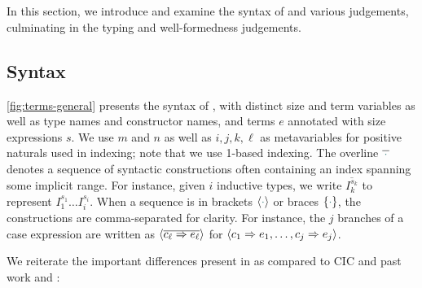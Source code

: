 \section{\titlelang}\label{sec:typing}
In this section, we introduce and examine the syntax of \lang and various judgements,
culminating in the typing and well-formedness judgements.

\subsection{Syntax}




\autoref{fig:terms-general} presents the syntax of \lang,
with distinct size and term variables as well as \coinductive type names and \coinductive constructor names,
and terms $e$ annotated with size expressions $s$.
We use $m$ and $n$ as well as $i, j, k, \ell$ as metavariables for positive naturals used in indexing; note that we use 1-based indexing.
The overline $\overline{\,\ph\,}$ denotes a sequence of syntactic constructions often containing an index spanning some implicit range.
For instance, given $i$ inductive types, we write $\overline{I^{s_k}_k}$ to represent $I^{s_1}_1 \dots I^{s_i}_i$.
When a sequence is in brackets $\seq{\ph}$ or braces $\set{\ph}$,
the constructions are comma-separated for clarity.
For instance, the $j$ branches of a case expression are written as $\langle\overline{c_\ell \Rightarrow e_\ell}\rangle$ for $\langle c_1 \Rightarrow e_1, \dots, c_j \Rightarrow e_j\rangle$.

We reiterate the important differences present in \lang as compared to CIC and past work \CIChat and \CIChatminus:

